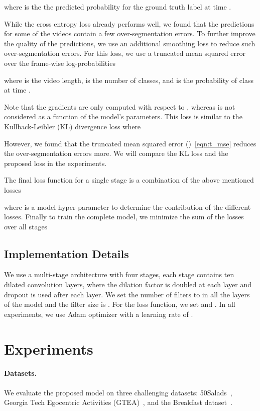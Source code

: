 \documentclass[10pt,twocolumn,letterpaper]{article}
\begin{document}
where  is the the predicted probability for the ground truth 
label at time .

While the cross entropy loss already performs well, we found that the predictions 
for some of the videos contain a few over-segmentation errors. To further improve 
the quality of the predictions, we use an additional smoothing loss to reduce such 
over-segmentation errors. For this loss, we use a truncated mean squared error over 
the frame-wise log-probabilities




where  is the video length,  is the number of classes, and  
is the probability of class  at time . 

Note that the gradients are only computed 
with respect to , whereas  is not considered as a function 
of the model's parameters. This loss is similar to the Kullback-Leibler (KL) 
divergence loss where 

However, we found that the truncated mean squared error ()~\eqref{eqn:t_mse} 
reduces the over-segmentation errors more. We will compare the KL loss and the proposed 
loss in the experiments.

The final loss function for a single stage is a combination of the 
above mentioned losses

where  is a model hyper-parameter to determine the contribution of 
the different losses. Finally to train the complete model, we minimize the 
sum of the losses over all stages



\subsection{Implementation Details}
\label{sec:implementation details}
We use a multi-stage architecture with four stages, each stage contains 
ten dilated convolution layers, where the dilation factor is doubled at 
each layer and dropout is used after each layer. We set the number of 
filters to  in all the layers of the model and the filter size is . 
For the loss function, we set  and . In all experiments, 
we use Adam optimizer with a learning rate of .
\section{Experiments}
\paragraph{Datasets.} We evaluate the proposed model on three challenging 
datasets: 50Salads~\cite{stein2013combining}, Georgia Tech Egocentric Activities 
(GTEA)~\cite{fathi2011learning}, and the Breakfast dataset~\cite{kuehne2014language}.
\end{document}

